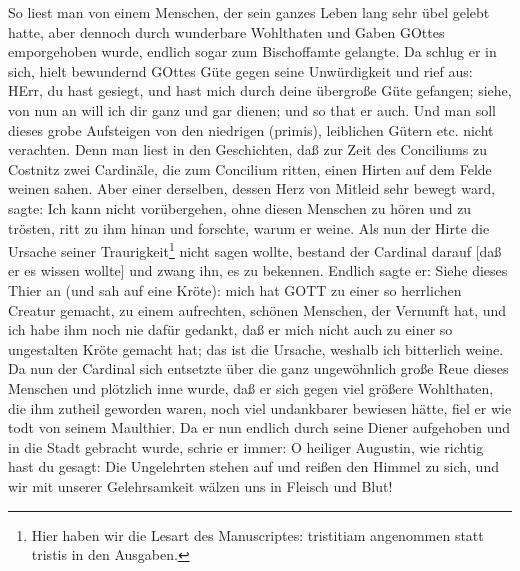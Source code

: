 So liest man von einem Menschen, der sein ganzes Leben lang sehr übel gelebt hatte, aber dennoch durch wunderbare Wohlthaten und Gaben GOttes emporgehoben wurde, endlich sogar zum Bischoffamte gelangte. Da schlug er in sich, hielt bewundernd GOttes Güte gegen seine Unwürdigkeit und rief aus: HErr, du hast gesiegt, und hast mich durch deine übergroße Güte gefangen; siehe, von nun an will ich dir ganz und gar dienen; und so that er auch. Und man soll dieses grobe Aufsteigen von den niedrigen (primis), leiblichen Gütern etc. nicht verachten. Denn man liest in den Geschichten, daß zur Zeit des Conciliums zu Costnitz zwei Cardinäle, die zum Concilium ritten, einen Hirten auf dem Felde weinen sahen. Aber einer derselben, dessen Herz von Mitleid sehr bewegt ward, sagte: Ich kann nicht vorübergehen, ohne diesen Menschen zu hören und zu trösten, ritt zu ihm hinan und forschte, warum er weine. Als nun der Hirte die Ursache seiner Traurigkeit\footnote{Hier haben wir die Lesart des Manuscriptes: tristitiam angenommen statt tristis in den Ausgaben.} nicht sagen wollte, bestand der Cardinal darauf [daß er es wissen wollte] und zwang ihn, es zu bekennen. Endlich sagte er: Siehe dieses Thier an (und sah auf eine Kröte): mich hat GOTT zu einer so herrlichen Creatur gemacht, zu einem aufrechten, schönen Menschen, der Vernunft hat, und ich habe ihm noch nie dafür gedankt, daß er mich nicht auch zu einer so ungestalten Kröte gemacht hat; das ist die Ursache, weshalb ich bitterlich weine. Da nun der Cardinal sich entsetzte über die ganz ungewöhnlich große Reue dieses Menschen und plötzlich inne wurde, daß er sich gegen viel größere Wohlthaten, die ihm zutheil geworden waren, noch viel undankbarer bewiesen hätte, fiel er wie todt von seinem Maulthier. Da er nun endlich durch seine Diener aufgehoben und in die Stadt gebracht wurde, schrie er immer: O heiliger Augustin, wie richtig hast du gesagt: Die Ungelehrten stehen auf und reißen den Himmel zu sich, und wir mit unserer Gelehrsamkeit wälzen uns in Fleisch und Blut!

